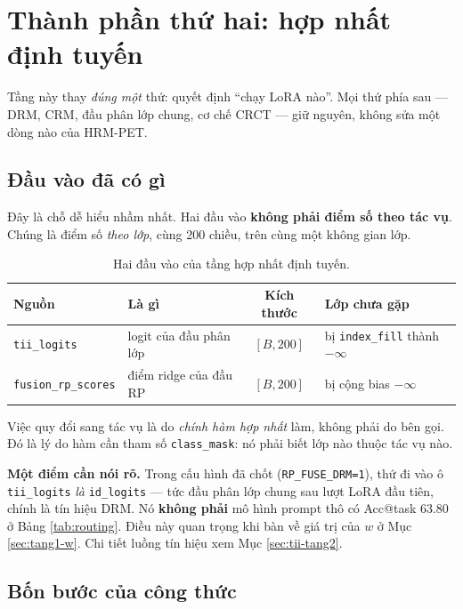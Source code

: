 \documentclass[11pt,a4paper]{article}
\newenvironment{luuy}{\begin{leftbar}\noindent\ignorespaces}{\end{leftbar}}
\begin{document}
\section{Thành phần thứ hai: hợp nhất định tuyến}
\label{sec:tang1}

Tầng này thay \emph{đúng một} thứ: quyết định ``chạy LoRA nào''. Mọi thứ phía sau
--- DRM, CRM, đầu phân lớp chung, cơ chế CRCT --- giữ nguyên, không sửa một dòng
nào của HRM-PET.

\subsection{Đầu vào đã có gì}
\label{sec:tang1-dauvao}

Đây là chỗ dễ hiểu nhầm nhất. Hai đầu vào \textbf{không phải điểm số theo tác
vụ}. Chúng là điểm số \emph{theo lớp}, cùng 200 chiều, trên cùng một không gian
lớp.

\begin{table}[htbp]
\centering
\caption{Hai đầu vào của tầng hợp nhất định tuyến.}
\label{tab:tang1-dauvao}
\begin{tabular}{@{}p{3.4cm}p{4.4cm}cp{3.4cm}@{}}
\toprule
Nguồn & Là gì & Kích thước & Lớp chưa gặp \\
\midrule
\texttt{tii\_logits} & logit của đầu phân lớp & $[B, 200]$
  & bị \texttt{index\_fill} thành $-\infty$ \\
\texttt{fusion\_rp\_scores} & điểm ridge của đầu RP & $[B, 200]$
  & bị cộng bias $-\infty$ \\
\bottomrule
\end{tabular}
\end{table}

Việc quy đổi sang tác vụ là do \emph{chính hàm hợp nhất} làm, không phải do bên
gọi. Đó là lý do hàm cần tham số \texttt{class\_mask}: nó phải biết lớp nào thuộc
tác vụ nào.

\begin{luuy}
\textbf{Một điểm cần nói rõ.} Trong cấu hình đã chốt
(\texttt{RP\_FUSE\_DRM=1}), thứ đi vào ô \texttt{tii\_logits} \emph{là}
\texttt{id\_logits} --- tức đầu phân lớp chung sau lượt LoRA đầu tiên, chính là
tín hiệu DRM. Nó \textbf{không phải} mô hình prompt thô có Acc@task $63.80$ ở
Bảng \ref{tab:routing}. Điều này quan trọng khi bàn về giá trị của $w$ ở Mục
\ref{sec:tang1-w}. Chi tiết luồng tín hiệu xem Mục \ref{sec:tii-tang2}.
\end{luuy}

\subsection{Bốn bước của công thức}
\end{document}
